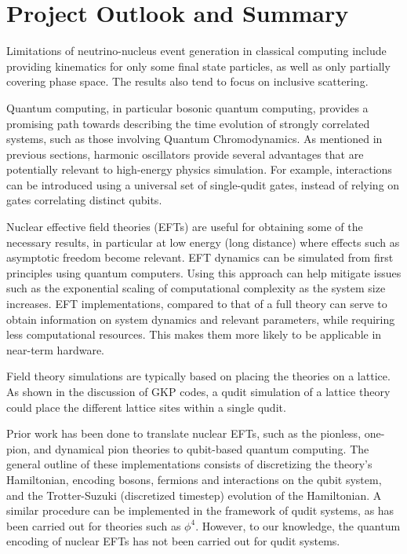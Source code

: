 
\chapter{Project Outlook and Summary}

Limitations of neutrino-nucleus event generation in classical computing include providing kinematics for only some final state particles, as well as only partially covering phase space. The results also tend to focus on inclusive scattering.

Quantum computing, in particular bosonic quantum computing, provides a promising path towards describing the time evolution of strongly correlated systems, such as those involving Quantum Chromodynamics. As mentioned in previous sections, harmonic oscillators provide several advantages that are potentially relevant to high-energy physics simulation. For example, interactions can be introduced using a universal set of single-qudit gates, instead of relying on gates correlating distinct qubits.

Nuclear effective field theories (EFTs) are useful for obtaining some of the necessary results, in particular at low energy (long distance) where effects such as asymptotic freedom become relevant. EFT dynamics can be simulated from first principles using quantum computers. Using this approach can help mitigate issues such as the exponential scaling of computational complexity as the system size increases. EFT implementations, compared to that of a full theory can serve to obtain information on system dynamics and relevant parameters, while requiring less computational resources. This makes them more likely to be applicable in near-term hardware.

Field theory simulations are typically based on placing the theories on a lattice. As shown in the discussion of GKP codes, a qudit simulation of a lattice theory could place the different lattice sites within a single qudit. 

Prior work has been done to translate nuclear EFTs, such as the pionless, one-pion, and dynamical pion theories to qubit-based quantum computing\cite{Bauer2021,Roggero2019,Watson2023}. The general outline of these implementations consists of discretizing the theory's Hamiltonian, encoding bosons, fermions and interactions on the qubit system, and the Trotter-Suzuki (discretized timestep) evolution of the Hamiltonian. A similar procedure can be implemented in the framework of qudit systems, as has been carried out for theories such as $\phi^4$\cite{kurkcuoglu,Illa2024,Gustafson2021}. However, to our knowledge, the quantum encoding of nuclear EFTs has not been carried out for qudit systems.

